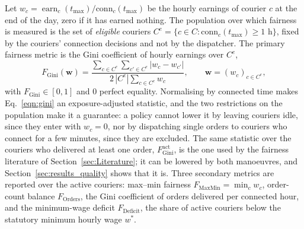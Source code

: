 \documentclass[a4paper,11pt,review,3p,authoryear]{elsarticle}
\newcommand{\FG}{F_{\text{Gini}}}
\newcommand{\FGa}{F_{\text{Gini}}^{\text{act}}}
\newcommand{\conn}{\mathrm{conn}}
\newcommand{\FD}{F_{\text{Deficit}}}
\newcommand{\FO}{F_{\text{Orders}}}
\newcommand{\FM}{F_{\text{MaxMin}}}
\DeclareMathOperator{\earn}{earn}
\begin{document}
Let $w_c = \earn_c(t_{\max})/\conn_c(t_{\max})$ be the hourly earnings of courier $c$ at the end of the day, zero if it has earned nothing. The population over which fairness is measured is the set of \emph{eligible} couriers $C^{e} = \{c \in C : \conn_c(t_{\max}) \ge 1 \text{ h}\}$, fixed by the couriers' connection decisions and not by the dispatcher. The primary fairness metric is the Gini coefficient of hourly earnings over $C^{e}$,
\begin{equation}
\FG(\mathbf{w}) = \frac{\sum_{c \in C^{e}} \sum_{c' \in C^{e}} |w_c - w_{c'}|}{2\,|C^{e}| \sum_{c \in C^{e}} w_c},
\qquad \mathbf{w} = (w_c)_{c \in C^{e}},
\label{eqn:gini}
\end{equation}
with $\FG \in [0,1]$ and $0$ perfect equality. Normalising by connected time makes Eq.~\eqref{eqn:gini} an exposure-adjusted statistic, and the two restrictions on the population make it a guarantee: a policy cannot lower it by leaving couriers idle, since they enter with $w_c = 0$, nor by dispatching single orders to couriers who connect for a few minutes, since they are excluded. The same statistic over the couriers who delivered at least one order, $\FGa$, is the one used by the fairness literature of Section~\ref{sec:Literature}; it can be lowered by both manoeuvres, and Section~\ref{sec:results_quality} shows that it is. Three secondary metrics are reported over the active couriers: max--min fairness $\FM = \min_c w_c$, order-count balance $\FO$, the Gini coefficient of orders delivered per connected hour, and the minimum-wage deficit $\FD$, the share of active couriers below the statutory minimum hourly wage $w^*$.
\end{document}
